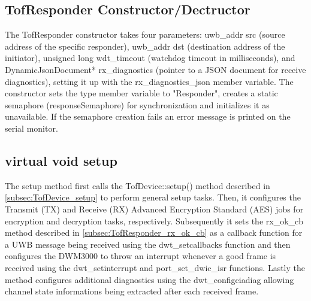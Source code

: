 \subsection{TofResponder Constructor/Dectructor}
\label{subsec:TofResponder_Constructor}
The TofResponder constructor takes four parameters: uwb\_addr src (source address of the specific responder), uwb\_addr dst (destination address of the initiator), unsigned long wdt\_timeout (watchdog timeout in milliseconds), and DynamicJsonDocument* rx\_diagnostics (pointer to a JSON document for receive diagnostics), setting it up with the rx\_diagnostics\_json member variable. 
\vspace{4pt}
\newline
The constructor sets the type member variable to "Responder", creates a static semaphore (responseSemaphore) for synchronization and initializes it as unavailable. 
If the semaphore creation fails an error message is printed on the serial monitor. 

\subsection{virtual void setup}
\label{subsec:TofResponder_setup}
The setup method first calls the TofDevice::setup() method described in \ref{subsec:TofDevice_setup} to perform general setup tasks. 
Then, it configures the Transmit (TX) and Receive (RX) Advanced Encryption Standard (AES) jobs for encryption and decryption tasks, respectively. 
Subsequently it sets the rx\_ok\_cb method described in \ref{subsec:TofResponder_rx_ok_cb} as a callback function for a UWB message being received using the dwt\_setcallbacks function and then configures the DWM3000 to throw an interrupt whenever a good frame is received using the dwt\_setinterrupt and port\_set\_dwic\_isr functions. 
Lastly the method configures additional diagnostics using the dwt\_configciadiag allowing channel state informations being extracted after each received frame. 

